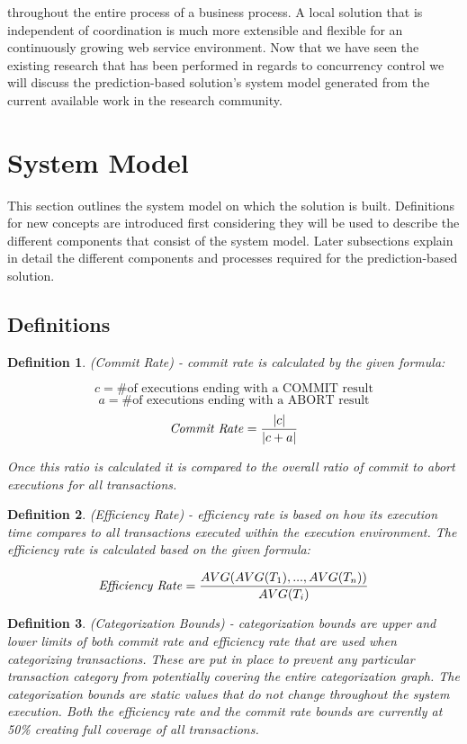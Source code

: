 \documentclass[conference]{IEEEtran}
\newtheorem{definition}{Definition}
\DeclarePairedDelimiter\abs{\lvert}{\rvert}%
\begin{document}
throughout the entire process of a business process. A local solution that is independent of coordination is much more extensible and flexible for an continuously growing web service environment. Now that we have seen the existing research that has been performed in regards to concurrency control we will discuss the prediction-based solution's system model generated from the current available work in the research community.

\section{System Model}
\label{sec:system_model}
This section outlines the system model on which the solution is built. Definitions for new concepts are introduced first considering they will be used to describe the different components that consist of the system model. Later subsections explain in detail the different components and processes required for the prediction-based solution.

\subsection{Definitions}
\label{definitions}

\begin{definition}
\label{cmt_rate}
 (Commit Rate) - commit rate is calculated by the given formula:
 
 \[\textrm{$c$} = \textrm{\# of executions ending with a COMMIT result}\]
 \[\textrm{$a$} = \textrm{\# of executions ending with a ABORT result}\]
 \[\textrm{\textit{Commit Rate}} =\frac{\abs{c}}{\abs{c + a}}\]
 
 Once this ratio is calculated it is compared to the overall ratio of commit to abort executions for all transactions.
 
\end{definition}

\begin{definition}
\label{eff_rate}
 (Efficiency Rate) - efficiency rate is based on how its execution time compares to all transactions executed within the execution environment. The efficiency rate is calculated based on the given formula:
 
\[\textrm{\textit{Efficiency Rate}} =\frac{\textrm{$AVG(AVG(T_{1}),...,AVG(T_{n}))$}}{\textrm{$AVG(T_{i})$}}\]
 
\end{definition}

\begin{definition}
\label{cat_bounds}
 (Categorization Bounds) - categorization bounds are upper and lower limits of both commit rate and efficiency rate that are used when categorizing transactions. These are put in place to prevent any particular transaction category from potentially covering the entire categorization graph. The categorization bounds are static values that do not change throughout the system execution. Both the efficiency rate and the commit rate bounds are currently at 50\% creating full coverage of all transactions.
\end{definition}
\end{document}
